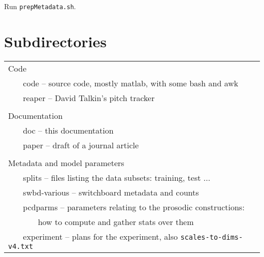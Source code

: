 \documentclass[11pt]{article}
\begin{document}
Run {\tt prepMetadata.sh}.

\section{Subdirectories}

\begin{tabular}{l}
Code \\
~~~ code -- source code, mostly matlab, with some bash and awk \\
~~~ reaper --  David Talkin's pitch tracker  \\
\\
Documentation \\
~~~ doc -- this documentation \\
~~~ paper -- draft of a journal article \\
\\
Metadata and model parameters  \\
~~~ splits -- files listing the data subsets: training, test ... \\
~~~ swbd-various -- switchboard metadata and counts \\
~~~ pcdparms -- parameters relating to the prosodic constructions: \\
~~~ ~~~ how to compute and gather stats over them \\
~~~ experiment -- plans for the experiment, also {\tt scales-to-dims-v4.txt} \\
\end{tabular}
\end{document}
